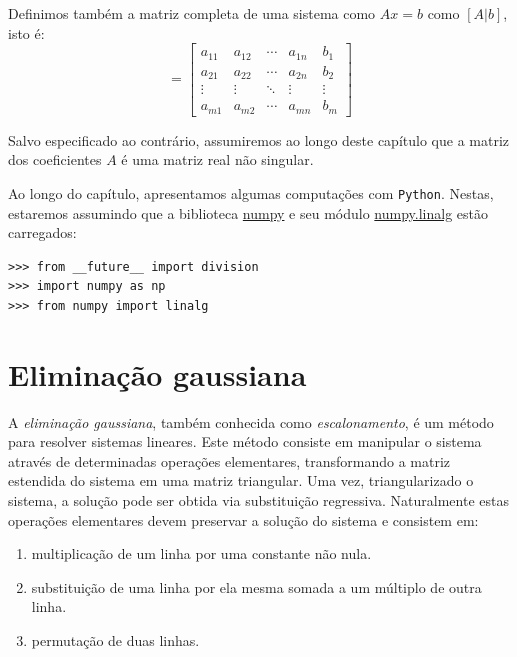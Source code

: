 Definimos também a matriz completa de uma sistema como $Ax=b$ como $[A|b]$, isto é:
\begin{equation*}
 [A|b]=\left[\begin{array}{cccc|c}
a_{11} & a_{12} & \cdots & a_{1n}&b_1\\
a_{21} & a_{22} & \cdots & a_{2n}&b_2\\
\vdots & \vdots & \ddots & \vdots&\vdots\\
a_{m1} & a_{m2} & \cdots & a_{mn}&b_m
\end{array}\right]
\end{equation*}


Salvo especificado ao contrário, assumiremos ao longo deste capítulo que a matriz dos coeficientes $A$ é uma matriz real não singular.

\ifispython
Ao longo do capítulo, apresentamos algumas computações com \verb+Python+. Nestas, estaremos assumindo que a biblioteca \href{http://www.numpy.org/}{numpy} e seu módulo \href{https://docs.scipy.org/doc/numpy/reference/routines.linalg.html}{numpy.linalg} estão carregados:
\begin{verbatim}
>>> from __future__ import division
>>> import numpy as np
>>> from numpy import linalg
\end{verbatim}
\fi






\section{Eliminação gaussiana}
A \emph{eliminação gaussiana}, também conhecida como \emph{escalonamento}, é um método para resolver sistemas lineares. Este método consiste em manipular o sistema através de determinadas operações elementares, transformando a matriz estendida do sistema em uma matriz triangular. Uma vez, triangularizado o sistema, a solução pode ser obtida via substituição regressiva. Naturalmente estas operações elementares devem preservar a solução do sistema e consistem em:
\begin{enumerate}
\item multiplicação de um linha por uma constante não nula.
\item substituição de uma linha por ela mesma somada a um múltiplo de outra linha.
\item permutação de duas linhas.
\end{enumerate}

